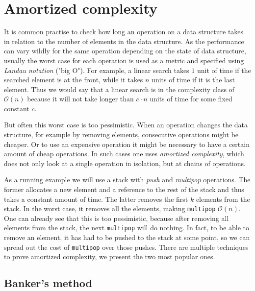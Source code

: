 \documentclass[sigplan,screen]{acmart}
\renewcommand\O[1]{$\mathcal{O}(#1)$}
\begin{document}
\section{Amortized complexity}\label{sec:complexity}

It is common practise to check how long an operation on a data structure takes in relation to the number of elements in the data structure. As the performance can vary wildly for the same operation depending on the state of data structure, usually the worst case for each operation is used as a metric and specified using \textit{Landau notation} ("big O"). For example, a linear search takes $1$ unit of time if the searched element is at the front, while it takes $n$ units of time if it is the last element. Thus we would say that a linear search is in the complexity class of \O{n} because it will not take longer than $c \cdot n$ units of time for some fixed constant $c$.

But often this worst case is too pessimistic. When an operation changes the data structure, for example by removing elements, consecutive operations might be cheaper. Or to use an expensive operation it might be necessary to have a certain amount of cheap operations. In such cases one uses \textit{amortized complexity}, which does not only look at a single operation in isolation, but at chains of operations.

As a running example we will use a stack with \textit{push} and \textit{multipop} operations. The former allocates a new element and a reference to the rest of the stack and thus takes a constant amount of time. The latter removes the first $k$ elements from the stack. In the worst case, it removes all the elements, making \texttt{multipop} \O{n}. One can already see that this is too pessimistic, because after removing all elements from the stack, the next \texttt{multipop} will do nothing. In fact, to be able to remove an element, it has had to be pushed to the stack at some point, so we can spread out the cost of \texttt{multipop} over those pushes. There are multiple techniques to prove amortized complexity, we present the two most popular ones.

\subsection{Banker's method}\label{sec:banker}
\end{document}

